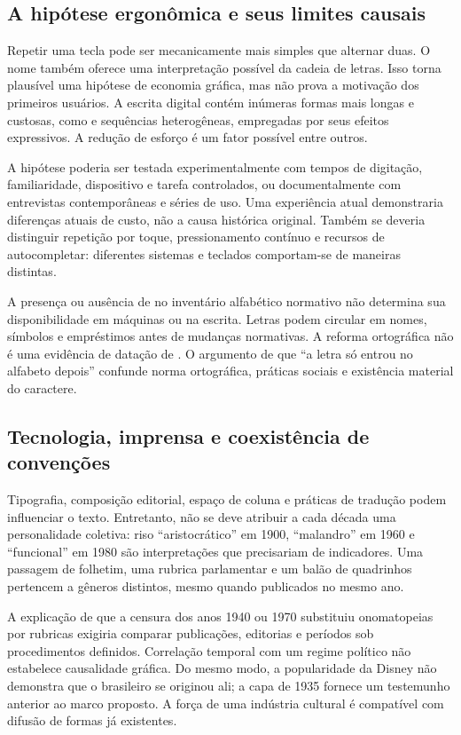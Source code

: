 \subsection{A hipótese ergonômica e seus limites causais}
Repetir uma tecla pode ser mecanicamente mais simples que alternar duas. O nome  também oferece uma interpretação possível da cadeia de letras. Isso torna plausível uma hipótese de economia gráfica, mas não prova a motivação dos primeiros usuários. A escrita digital contém inúmeras formas mais longas e custosas, como  e sequências heterogêneas, empregadas por seus efeitos expressivos. A redução de esforço é um fator possível entre outros.

A hipótese poderia ser testada experimentalmente com tempos de digitação, familiaridade, dispositivo e tarefa controlados, ou documentalmente com entrevistas contemporâneas e séries de uso. Uma experiência atual demonstraria diferenças atuais de custo, não a causa histórica original. Também se deveria distinguir repetição por toque, pressionamento contínuo e recursos de autocompletar: diferentes sistemas e teclados comportam-se de maneiras distintas.

A presença ou ausência de  no inventário alfabético normativo não determina sua disponibilidade em máquinas ou na escrita. Letras podem circular em nomes, símbolos e empréstimos antes de mudanças normativas. A reforma ortográfica não é uma evidência de datação de . O argumento de que ``a letra só entrou no alfabeto depois'' confunde norma ortográfica, práticas sociais e existência material do caractere.

\subsection{Tecnologia, imprensa e coexistência de convenções}
Tipografia, composição editorial, espaço de coluna e práticas de tradução podem influenciar o texto. Entretanto, não se deve atribuir a cada década uma personalidade coletiva: riso ``aristocrático'' em 1900, ``malandro'' em 1960 e ``funcional'' em 1980 são interpretações que precisariam de indicadores. Uma passagem de folhetim, uma rubrica parlamentar e um balão de quadrinhos pertencem a gêneros distintos, mesmo quando publicados no mesmo ano.

A explicação de que a censura dos anos 1940 ou 1970 substituiu onomatopeias por rubricas exigiria comparar publicações, editorias e períodos sob procedimentos definidos. Correlação temporal com um regime político não estabelece causalidade gráfica. Do mesmo modo, a popularidade da Disney não demonstra que o  brasileiro se originou ali; a capa de 1935 fornece um testemunho anterior ao marco proposto. A força de uma indústria cultural é compatível com difusão de formas já existentes.

